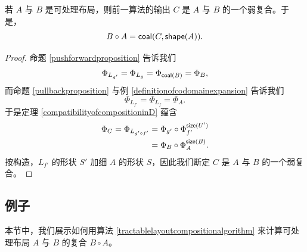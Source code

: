 \begin{theorem}
    若 $A$ 与 $B$ 是可处理布局，则前一算法的输出 $C$ 是 $A$ 与 $B$ 的一个弱复合。于是，
    \[
    B \circ A = \mathsf{coal}(C,\mathsf{shape}(A)).
    \]
\end{theorem}

\begin{proof}
    命题 \ref{pushforwardproposition} 告诉我们
    \[\Phi_{L_{g'}} = \Phi_{L_g} = \Phi_{\mathsf{coal}(B)} = \Phi_B,\]
    而命题 \ref{pullbackproposition} 与例 \ref{definitionofcodomainexpansion} 告诉我们
    \[\Phi_{L_{f'}} = \Phi_{L_f}  = \Phi_A.\]
    于是定理 \ref{compatibilityofcompositioninD} 蕴含
    \begin{align*}
    \Phi_C = \Phi_{L_{g' \circ f'}} & = \Phi_{g'} \circ \Phi_{f'}^{\mathsf{size}(U')}\\
    & = \Phi_B \circ \Phi_A^{\mathsf{size}(B)}.
    \end{align*}
    按构造，$L_{f'}$ 的形状 $S'$ 加细 $A$ 的形状 $S$，因此我们断定 $C$ 是 $A$ 与 $B$ 的一个弱复合。
\end{proof}






\subsection{例子}

本节中，我们展示如何用算法 \ref{tractablelayoutcompositionalgorithm} 来计算可处理布局 $A$ 与 $B$ 的复合 $B \circ A$。

